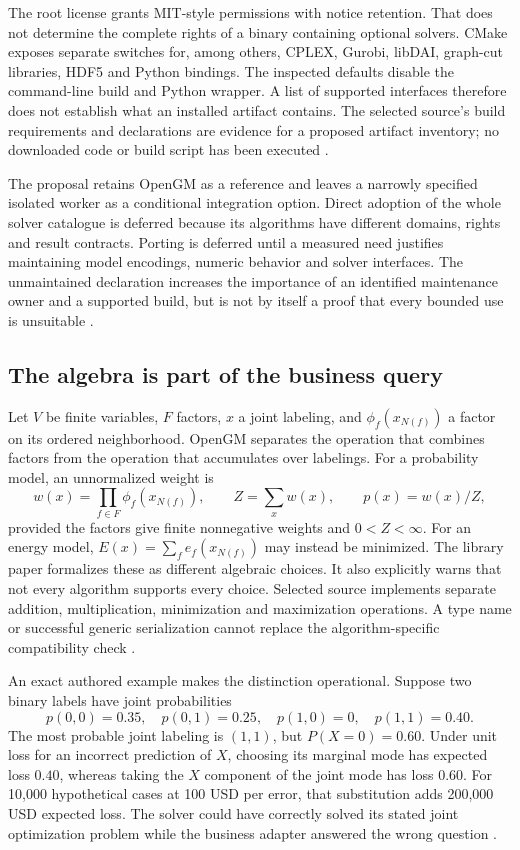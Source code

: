 The root license grants MIT-style permissions with notice retention. That
does not determine the complete rights of a binary containing optional
solvers. CMake exposes separate switches for, among others, CPLEX, Gurobi,
libDAI, graph-cut libraries, HDF5 and Python bindings. The inspected defaults
disable the command-line build and Python wrapper. A list of supported
interfaces therefore does not establish what an installed artifact contains.
The selected source's build requirements and declarations are evidence for
a proposed artifact inventory; no downloaded code or build script has been
executed \cite{exec24_opengm_source}.

The proposal retains OpenGM as a reference and leaves a narrowly specified
isolated worker as a conditional integration option. Direct adoption of the
whole solver catalogue is deferred because its algorithms have different
domains, rights and result contracts. Porting is deferred until a measured
need justifies maintaining model encodings, numeric behavior and solver
interfaces. The unmaintained declaration increases the importance of an
identified maintenance owner and a supported build, but is not by itself a
proof that every bounded use is unsuitable \cite{exec24_opengm_choice}.

\subsection{The algebra is part of the business query}
Let $V$ be finite variables, $F$ factors, $x$ a joint labeling, and
$\phi_f(x_{N(f)})$ a factor on its ordered neighborhood. OpenGM separates
the operation that combines factors from the operation that accumulates
over labelings. For a probability model, an unnormalized weight is
\[
 w(x)=\prod_{f\in F}\phi_f(x_{N(f)}),\qquad
 Z=\sum_x w(x),\qquad p(x)=w(x)/Z,
\]
provided the factors give finite nonnegative weights and $0<Z<\infty$.
For an energy model, $E(x)=\sum_f e_f(x_{N(f)})$ may instead be minimized.
The library paper formalizes these as different algebraic choices. It also
explicitly warns that not every algorithm supports every choice. Selected
source implements separate addition, multiplication, minimization and
maximization operations. A type name or successful generic serialization
cannot replace the algorithm-specific compatibility check
\cite{exec24_opengm_paper,exec24_opengm_source}.

An exact authored example makes the distinction operational. Suppose two
binary labels have joint probabilities
\[
 p(0,0)=0.35,\quad p(0,1)=0.25,\quad p(1,0)=0,\quad p(1,1)=0.40.
\]
The most probable joint labeling is $(1,1)$, but $P(X=0)=0.60$. Under
unit loss for an incorrect prediction of $X$, choosing its marginal mode
has expected loss $0.40$, whereas taking the $X$ component of the joint
mode has loss $0.60$. For 10,000 hypothetical cases at 100 USD per error,
that substitution adds 200,000 USD expected loss. The solver could have
correctly solved its stated joint optimization problem while the business
adapter answered the wrong question \cite{exec24_opengm_choice}.

